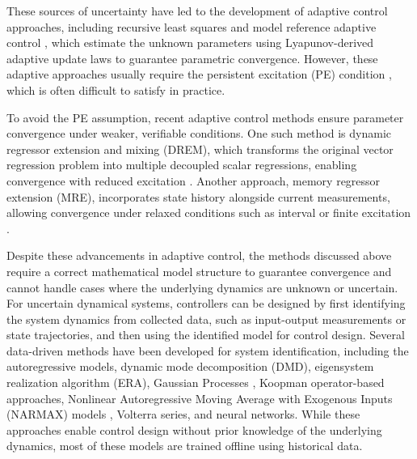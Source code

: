 \documentclass[conference]{ieeeconf}
\begin{document}
These sources of uncertainty have led to the development of adaptive control approaches, including recursive least squares and model reference adaptive control \cite{SCC.Ioannou.Sun1996}, which estimate the unknown parameters using Lyapunov-derived adaptive update laws to guarantee parametric convergence. However, these adaptive approaches usually require the persistent excitation (PE) condition \cite{SCC.Astrom.Wittenmark1989, SCC.Krstic.Kanellakopoulos.ea1995, SCC.Ioannou.Sun1996, SCC.Kamalapurkar2017, SCC.Pan.Shi.ea2024}, which is often difficult to satisfy in practice.

To avoid the PE assumption, recent adaptive control methods ensure parameter convergence under weaker, verifiable conditions. One such method is dynamic regressor extension and mixing (DREM), which transforms the original vector regression problem into multiple decoupled scalar regressions, enabling convergence with reduced excitation \cite{SCC.Pyrkin.Bobtsov.ea2019}. Another approach, memory regressor extension (MRE), incorporates state history alongside current measurements, allowing convergence under relaxed conditions such as interval or finite excitation \cite{SCC.Katiyar.BasuRoy.ea2022, SCC.Pan.Shi.ea2024, SCC.Qureshi.Ogri.ea2025, SCC.Parikh.Kamalapurkar.ea2019, SCC.Ogri.Bell.ea2023, SCC.Xing.Na.ea2025}.

Despite these advancements in adaptive control, the methods discussed above require a correct mathematical model structure to guarantee convergence and cannot handle cases where the underlying dynamics are unknown or uncertain. For uncertain dynamical systems, controllers can be designed by first identifying the system dynamics from collected data, such as input-output measurements or state trajectories, and then using the identified model for control design. Several data-driven methods have been developed for system identification, including the autoregressive models\cite{Akaike1998}, dynamic mode decomposition (DMD)\cite{Kutz2016}, eigensystem realization algorithm (ERA)\cite{Juang1985}, Gaussian Processes \cite{SCC.Csato.Opper2002,SCC.Qureshi.Ogri.ea2024}, Koopman operator-based approaches\cite{Mezic2005}, Nonlinear Autoregressive Moving Average with Exogenous Inputs (NARMAX) models \cite{billings.2013.Narmax}, Volterra series\cite{Brockett1975}, and neural networks. While these approaches enable control design without prior knowledge of the underlying dynamics, most of these models are trained offline using historical data. 
\end{document}
